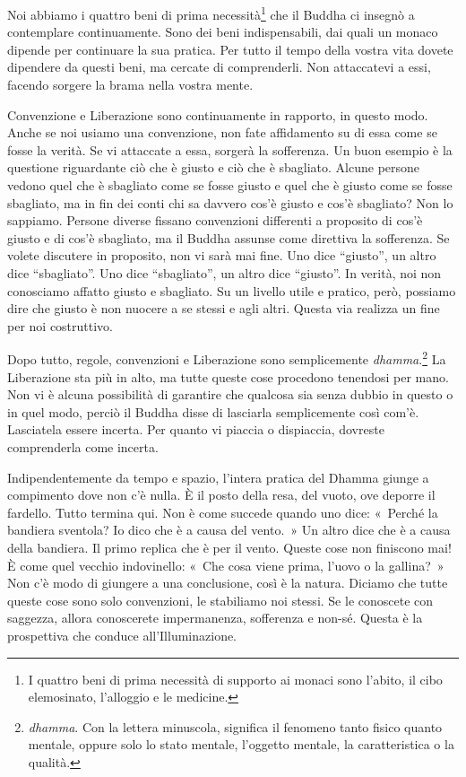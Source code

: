 Noi abbiamo i quattro beni di prima necessità\footnote{I quattro beni di
  prima necessità di supporto ai monaci sono l'abito, il cibo
  elemosinato, l'alloggio e le medicine.} che il Buddha ci insegnò a
contemplare continuamente. Sono dei beni indispensabili, dai quali un
monaco dipende per continuare la sua pratica. Per tutto il tempo della
vostra vita dovete dipendere da questi beni, ma cercate di comprenderli.
Non attaccatevi a essi, facendo sorgere la brama nella vostra mente.

Convenzione e Liberazione sono continuamente in rapporto, in questo
modo. Anche se noi usiamo una convenzione, non fate affidamento su di
essa come se fosse la verità. Se vi attaccate a essa, sorgerà la
sofferenza. Un buon esempio è la questione riguardante ciò che è giusto
e ciò che è sbagliato. Alcune persone vedono quel che è sbagliato come
se fosse giusto e quel che è giusto come se fosse sbagliato, ma in fin
dei conti chi sa davvero cos'è giusto e cos'è sbagliato? Non lo
sappiamo. Persone diverse fissano convenzioni differenti a proposito di
cos'è giusto e di cos'è sbagliato, ma il Buddha assunse come direttiva
la sofferenza. Se volete discutere in proposito, non vi sarà mai fine.
Uno dice ``giusto'', un altro dice ``sbagliato''. Uno dice
``sbagliato'', un altro dice ``giusto''. In verità, noi non conosciamo
affatto giusto e sbagliato. Su un livello utile e pratico, però,
possiamo dire che giusto è non nuocere a se stessi e agli altri. Questa
via realizza un fine per noi costruttivo.

Dopo tutto, regole, convenzioni e Liberazione sono semplicemente
\emph{dhamma}.\footnote{\emph{dhamma}. Con la lettera minuscola,
  significa il fenomeno tanto fisico quanto mentale, oppure solo lo
  stato mentale, l'oggetto mentale, la caratteristica o la qualità.} La
Liberazione sta più in alto, ma tutte queste cose procedono tenendosi
per mano. Non vi è alcuna possibilità di garantire che qualcosa sia
senza dubbio in questo o in quel modo, perciò il Buddha disse di
lasciarla semplicemente così com'è. Lasciatela essere incerta. Per
quanto vi piaccia o dispiaccia, dovreste comprenderla come incerta.

Indipendentemente da tempo e spazio, l'intera pratica del Dhamma giunge
a compimento dove non c'è nulla. È il posto della resa, del vuoto, ove
deporre il fardello. Tutto termina qui. Non è come succede quando uno
dice: «~Perché la bandiera sventola? Io dico che è a causa del vento.~»
Un altro dice che è a causa della bandiera. Il primo replica che è per
il vento. Queste cose non finiscono mai! È come quel vecchio
indovinello: «~Che cosa viene prima, l'uovo o la gallina?~» Non c'è modo
di giungere a una conclusione, così è la natura. Diciamo che tutte
queste cose sono solo convenzioni, le stabiliamo noi stessi. Se le
conoscete con saggezza, allora conoscerete impermanenza, sofferenza e
non-sé. Questa è la prospettiva che conduce all'Illuminazione.

